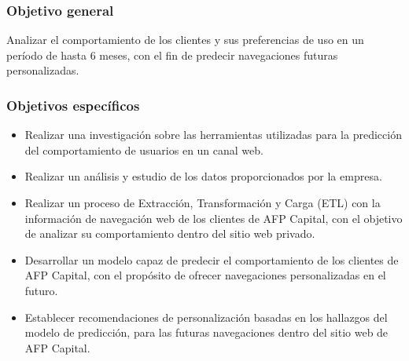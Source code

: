 \subsubsection{Objetivo general}
Analizar el comportamiento de los clientes y sus preferencias de uso en un período de hasta 6 meses, con el fin de predecir navegaciones futuras personalizadas.

\subsubsection{Objetivos específicos}
\begin{itemize}
\item Realizar una investigación sobre las herramientas utilizadas para la predicción del comportamiento de usuarios en un canal web.
\item Realizar un análisis y estudio de los datos proporcionados por la empresa.
\item Realizar un proceso de Extracción, Transformación y Carga (ETL) con la información de navegación web de los clientes de AFP Capital, con el objetivo de analizar su comportamiento dentro del sitio web privado.
\item Desarrollar un modelo capaz de predecir el comportamiento de los clientes de AFP Capital, con el propósito de ofrecer navegaciones personalizadas en el futuro.
\item Establecer recomendaciones de personalización basadas en los hallazgos del modelo de predicción, para las futuras navegaciones dentro del sitio web de AFP Capital.
\end{itemize}